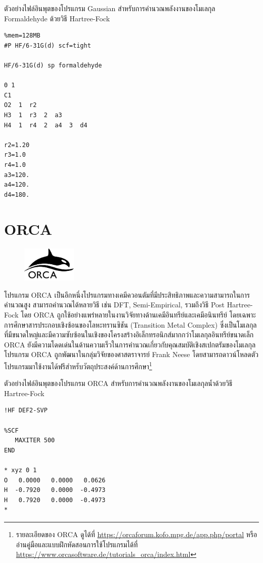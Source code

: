 \noindent ตัวอย่างไฟล์อินพุตของโปรแกรม Gaussian สำหรับการคำนวณพลังงานของโมเลกุล Formaldehyde ด้วยวิธี Hartree-Fock

\begin{lstlisting}[style=plain]
%chk=formaldehyde.chk
%mem=128MB
#P HF/6-31G(d) scf=tight

HF/6-31G(d) sp formaldehyde

0 1
C1
O2  1  r2
H3  1  r3  2  a3
H4  1  r4  2  a4  3  d4

r2=1.20
r3=1.0
r4=1.0
a3=120.
a4=120.
d4=180.
\end{lstlisting}

\section{ORCA}
\label{sec:software_orca}

\begin{figure}
    \centering
    \includegraphics[width=0.23\textwidth]{fig/logo_orca.png}
    \label{fig:logo_orca}
\end{figure}

โปรแกรม ORCA เป็นอีกหนึ่งโปรแกรมทางเคมีควอนตัมที่มีประสิทธิภาพและความสามารถในการคำนวณสูง\autocite{neese2012,neese2018} สามารถคำนวณได้หลายวิธี เช่น DFT, Semi-Empirical, รวมถึงวิธี Post Hartree-Fock โดย ORCA ถูกใช้อย่างแพร่หลายในงานวิจัยทางด้านเคมีอินทรีย์และเคมีอนินทรีย์ โดยเฉพาะการศึกษาสารประกอบเชิงซ้อนของโลหะทรานซิชัน (Transition Metal Complex) ซึ่งเป็นโมเลกุลที่มีขนาดใหญ่และมีความซับซ้อนในเชิงของโครงสร้างอิเล็กทรอนิกส์มากกว่าโมเลกุลอินทรีย์ขนาดเล็ก ORCA ยังมีความโดดเด่นในด้านความเร็วในการคำนวณเกี่ยวกับคุณสมบัติเชิงสเปกตรัมของโมเลกุล โปรแกรม ORCA ถูกพัฒนาในกลุ่มวิจัยของศาสตราจารย์ Frank Neese โดยสามารถดาวน์โหลดตัวโปรแกรมมาใช้งานได้ฟรีสำหรับวัตถุประสงค์ด้านการศึกษา\footnote{รายละเอียดของ ORCA ดูได้ที่ \url{https://orcaforum.kofo.mpg.de/app.php/portal} หรืออ่านคู่มือและแบบฝึกหัดสอนการใช้โปรแกรมได้ที่ \url{https://www.orcasoftware.de/tutorials_orca/index.html}}

\noindent ตัวอย่างไฟล์อินพุตของโปรแกรม ORCA สำหรับการคำนวณพลังงานของโมเลกุลน้ำด้วยวิธี Hartree-Fock

\begin{lstlisting}[style=plain]
!HF DEF2-SVP

%SCF
   MAXITER 500
END

* xyz 0 1
O   0.0000   0.0000   0.0626
H  -0.7920   0.0000  -0.4973
H   0.7920   0.0000  -0.4973
*
\end{lstlisting}

